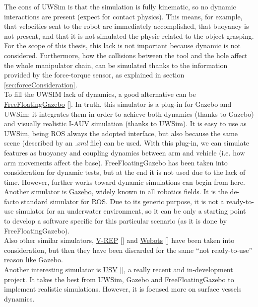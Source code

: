 The cons of UWSim is that the simulation is fully kinematic, so no dynamic interactions are present (expect for contact physics). This means, for example, that velocities sent to the robot are immediately accomplished, that buoyancy is not present, and that it is not simulated the physic related to the object grasping. For the scope of this thesis, this lack is not important because dynamic is not considered. Furthermore, how the collisions between the tool and the hole affect the whole manipulator chain, can be simulated thanks to the information provided by the force-torque sensor, as explained in section \ref{sec:forceConsideration}.\\

To fill the UWSIM lack of dynamics, a good alternative can be \href{https://github.com/freefloating-gazebo/freefloating_gazebo}{FreeFloatingGazebo} [\cite{freeFloatingGazebo}]. In truth, this simulator is a plug-in for Gazebo and UWSim; it integrates them in order to achieve both dynamics (thanks to Gazebo) and visually realistic I-AUV simulation (thanks to UWSim). It is easy to use as UWSim, being ROS always the adopted interface, but also because the same scene (described by an \textit{.xml} file) can be used. With this plug-in, we can simulate features as buoyancy and coupling dynamics between arm and vehicle (i.e. how arm movements affect the base).
FreeFloatingGazebo has been taken into consideration for dynamic tests, but at the end it is not used due to the lack of time. However, further works toward dynamic simulations can begin from here.\\

Another simulator is \href{http://gazebosim.org/}{Gazebo}, widely known in all robotics fields. It is the de-facto standard simulator for ROS. Due to its generic purpose, it is not a ready-to-use simulator for an underwater environment, so it can be only a starting point to develop a software specific for this particular scenario (as it is done by FreeFloatingGazebo).\\
Also other similar simulators, \href{http://www.coppeliarobotics.com/index.html}{V-REP} [\cite{vrep}] and \href{https://cyberbotics.com/}{Webots} [\cite{webots}] have been taken into consideration, but then they have been discarded for the same \enquote{not ready-to-use} reason like Gazebo.\\

Another interesting simulator is \href{https://github.com/disaster-robotics-proalertas/usv_sim_lsa}{USV} [\cite{usvsim}], a really recent and in-development project. It takes the best from UWSim, Gazebo and FreeFloatingGazebo to implement realistic simulations. However, it is focused more on surface vessels dynamics.\\

